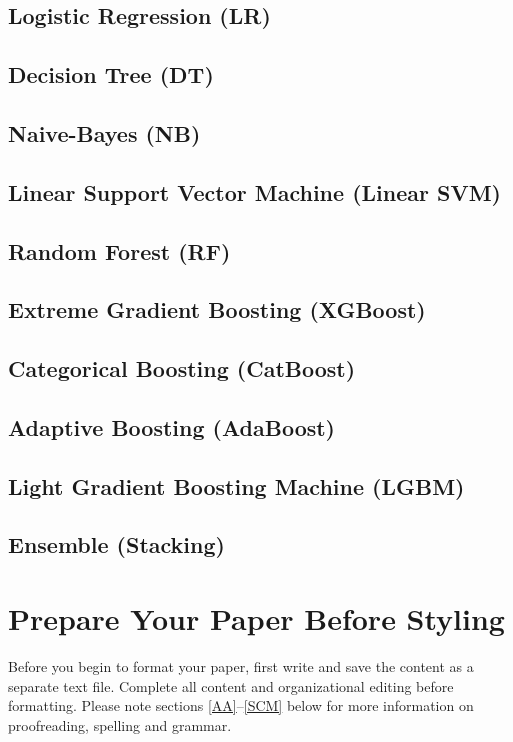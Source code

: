 \documentclass[conference]{IEEEtran}
\begin{document}
\subsection{Logistic Regression (LR)}

\subsection{Decision Tree (DT)}

\subsection{Naive-Bayes (NB)}

\subsection{Linear Support Vector Machine (Linear SVM)}

\subsection{Random Forest (RF)}

\subsection{Extreme Gradient Boosting (XGBoost)}

\subsection{Categorical Boosting (CatBoost)}

\subsection{Adaptive Boosting (AdaBoost)}

\subsection{Light Gradient Boosting Machine (LGBM)}

\subsection{Ensemble (Stacking)}

\section{Prepare Your Paper Before Styling}
Before you begin to format your paper, first write and save the content as a 
separate text file. Complete all content and organizational editing before 
formatting. Please note sections \ref{AA}--\ref{SCM} below for more information on 
proofreading, spelling and grammar.
\end{document}
